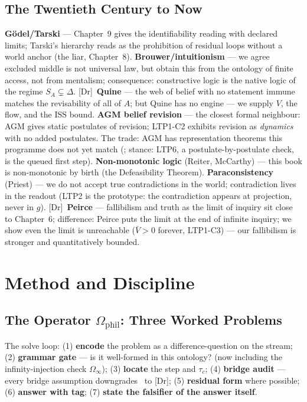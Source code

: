 \documentclass[11pt,a4paper,twoside]{book}
\newcommand{\tier}[1]{\textnormal{\small\textsf{[#1]}}}
\newcommand{\Dr}{\tier{Dr}}\newcommand{\Cj}{\tier{Cj}}\newcommand{\Wf}{\tier{Wf}}
\theoremstyle{plain}
\theoremstyle{definition}
\theoremstyle{remark}
\begin{document}
\chapter{The Twentieth Century to Now}

\textbf{G\"odel/Tarski} --- Chapter~9 gives the identifiability reading with
declared limits; Tarski's hierarchy reads as the prohibition of residual
loops without a world anchor (the liar, Chapter~8).
\textbf{Brouwer/intuitionism} --- we agree excluded middle is not universal
law, but obtain this from the ontology of finite access, not from mentalism;
consequence: constructive logic is the native logic of the regime
$S_A\subsetneq\Delta$. \Dr\ \textbf{Quine} --- the web of belief with no
statement immune matches the revisability of all of $A$; but Quine has no
engine --- we supply $V$, the flow, and the ISS bound.
\textbf{AGM belief revision} --- the closest formal neighbour: AGM gives
static postulates of revision; LTP1-C2 exhibits revision as \emph{dynamics}
with no added postulates. The trade: AGM has representation theorems this
programme does not yet match (\OpenT; stance: LTP6, a postulate-by-postulate
check, is the queued first step). \textbf{Non-monotonic logic}
(Reiter, McCarthy) --- this book is non-monotonic by birth (the Defeasibility
Theorem). \textbf{Paraconsistency} (Priest) --- we do not accept true
contradictions in the world; contradiction lives in the readout (LTP2 is the
prototype: the contradiction appears at projection, never in $g$). \Dr\
\textbf{Peirce} --- fallibilism and truth as the limit of inquiry sit close
to Chapter~6; difference: Peirce puts the limit at the end of infinite
inquiry; we show even the limit is unreachable ($\bar V>0$ forever,
LTP1-C3) --- our fallibilism is stronger and quantitatively bounded.

\part{Method and Discipline}

\chapter{The Operator $\Omega_{\mathrm{phil}}$: Three Worked Problems}

The solve loop: (1) \textbf{encode} the problem as a difference-question on
the stream; (2) \textbf{grammar gate} --- is it well-formed in this ontology?
(now including the infinity-injection check $\Omega_\infty$); (3)
\textbf{locate} the step and $\tau_c$; (4) \textbf{bridge audit} --- every
bridge assumption downgrades \Th\ to \Dr; (5) \textbf{residual form} where
possible; (6) \textbf{answer with tag}; (7) \textbf{state the falsifier of
the answer itself}.
\end{document}
